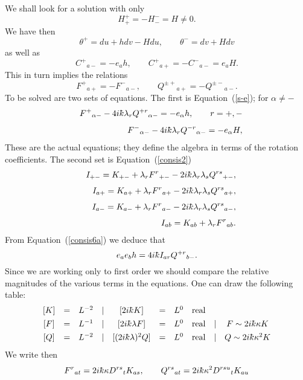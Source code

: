 \documentclass[12pt,a4paper]{article}
\newcounter{eg}
\def\kbar{{\mathchar'26\mkern-9muk}}
\begin{document}
We shall look for a solution with only
$$
H^+_+ = - H^-_- = H \neq 0.
$$
We have then
$$
\theta^+ = du + h dv - H du, \qquad
\theta^- = dv + H dv
$$
as well as
$$
C^+{}_{a-} = -e_a h, \qquad 
C^+{}_{a+} = - C^-{}_{a-} = e_a H.
$$
This in turn implies the relations
\begin{equation}
F^+{}_{a+} = - F^-{}_{a-}, \qquad 
Q^{\pm +}{}_{a+} = - Q^{\pm -}{}_{a-}.                  \label{a-a+}
\end{equation}
To be solved are two sets of equations. The first
is Equation~(\ref{s-e}); for $\alpha \neq -$
\begin{eqnarray}
&&F^+{}_{\alpha -} - 4i\kbar\lambda_r Q^{+r}{}_{\alpha -} 
=  - e_\alpha h, \qquad r = +,-               \label{consis6a}\\[4pt]
&&F^-{}_{\alpha -} - 4i\kbar\lambda_r Q^{-r}{}_{\alpha -} 
=  - e_\alpha H,                               \label{consis6b}
\end{eqnarray}
These are the actual equations; they define the algebra in terms of
the rotation coefficients.  The second set is Equation~(\ref{consis2})
\begin{eqnarray}
&&I_{+-} = K_{+-} + \lambda_r F^r{}_{+-} 
- 2i\kbar \lambda_r  \lambda_s Q^{rs}{}_{+-},       \label{consis6c}\\[4pt]
&&I_{a+} = K_{a+} + \lambda_r F^r{}_{a+} 
- 2i\kbar \lambda_r  \lambda_s Q^{rs}{}_{a+},       \label{consis6d}\\[4pt]
&&I_{a-} = K_{a-} + \lambda_r F^r{}_{a-} 
- 2i\kbar \lambda_r  \lambda_s Q^{rs}{}_{a-},       \label{consis6e}\\[4pt]
&&I_{ab} = K_{ab} + \lambda_r F^r{}_{ab}.           \label{consis6f}
\end{eqnarray}
From Equation~(\ref{consis6a}) we deduce that
$$
e_a e_b h = 4i\kbar I_{ar} Q^{+r}{}_{b-}.
$$ 
Since we are working only to first order we should compare the relative
magnitudes of the various terms in the equations. One can draw the
following table:
$$
\begin{array}{cccccccccc}
[K] &= &L^{-2} &| &[2i\kbar K] &=  &L^0 &\mbox{real} & \\[4pt]
[F] &= &L^{-1} &| &[2i\kbar \lambda F] &=  &L^0 &\mbox{real}
&| &F \sim 2i\kbar\kappa K \\[4pt]
[Q] &= &L^{-2} &| &[(2i\kbar \lambda )^2 Q] &=  &L^0 &\mbox{real} 
&| &Q \sim 2i\kbar\kappa^2 K
\end{array}
$$
We write then
$$
F^r{}_{at} = 2i\kbar\kappa D^{rs}{}_t K_{as},\qquad
Q^{rs}{}_{at} = 2i\kbar\kappa^2 D^{rsu}{}_t K_{au}
$$
\end{document}
